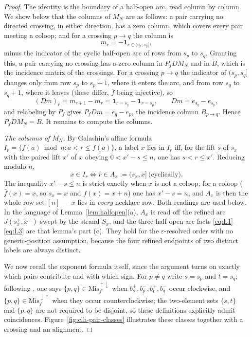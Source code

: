 \documentclass[11pt]{article}
\theoremstyle{definition}
\newcommand{\ba}{\bar f}
\begin{document}
\begin{proof}
The identity is the boundary of a half-open arc, read column by column. We show below that the columns of
$M_N$ are as follows: a pair carrying no directed crossing, in either direction, has a zero column, which
covers every pair meeting a coloop; and for a crossing $p\to q$ the column is
\[
   m_r=-\mathbf 1_{r\in(s_p,s_q]},
\]
minus the indicator of the cyclic half-open arc of rows from $s_p$ to $s_q$. Granting this, a pair carrying no
crossing has a zero column in $P_fDM_N$ and in $B$, which is the incidence matrix of the crossings. For a
crossing $p\to q$ the indicator of $(s_p,s_q]$ changes only from row $s_p$ to $s_p+1$, where it enters the
arc, and from row $s_q$ to $s_q+1$, where it leaves (these differ, $\ba$ being injective), so
\[
   (Dm)_r=m_{r+1}-m_r=\mathbf 1_{r=s_q}-\mathbf 1_{r=s_p},\qquad Dm=e_{s_q}-e_{s_p},
\]
and relabeling by $P_f$ gives $P_fDm=e_q-e_p$, the incidence column $B_{p\to q}$. Hence $P_fDM_N=B$. It
remains to compute the columns.

\emph{The columns of $M_N$.}
By Galashin's affine formula $I_r=\{f(a)\bmod n : a<r\le f(a)\}$, a label $x$ lies in $I_r$ iff, for the
lift $s$ of $s_x$ with the paired lift $x'$ of $x$ obeying $0<x'-s\le n$, one has $s<r\le x'$. Reducing
modulo $n$,
\begin{equation}\label{eq:arc}
   x\in I_r \iff r\in A_x:=(s_x,x]\ \text{(cyclically)}.
\end{equation}
The inequality $x'-s\le n$ is strict exactly when $x$ is not a coloop; for a coloop ($\ba(x)=x$, so
$s_x=x$ and $f(x)=x+n$) one has $x'-s=n$, and $A_x$ is then the whole row set $[n]$ --- $x$ lies in
\emph{every} necklace row. Both readings are used below. In the language of
Lemma~\ref{lem:halfopen}(a), $A_x$ is read off the refined arc $J(s_x^+,x^-)$ swept by the strand $S_x$,
and the three half-open arc facts \eqref{eq:L1}--\eqref{eq:L3} are that lemma's part (c). They hold for
the $\varepsilon$-resolved order with no generic-position assumption, because the four refined
endpoints of two distinct labels are always distinct.

We now recall the exponent formula itself, since the argument turns on exactly which pairs contribute and
with which sign. For $p\ne q$ write $s=s_p$ and $t=s_q$; following \cite[\S5.4]{Galashin}, one says
$\{p,q\}\in\mathrm{Mis}^{\uparrow\downarrow}_f$ when $b^+_{s},b^-_p,b^+_{t},b^-_q$ occur clockwise, and
$\{p,q\}\in\mathrm{Mis}^{\downarrow\uparrow}_f$ when they occur counterclockwise; the two-element sets
$\{s,t\}$ and $\{p,q\}$ are not required to be disjoint, so these definitions explicitly admit
coincidences. Figure~\ref{fig:clh-pair-classes} illustrates these classes together with a crossing and an alignment.


\end{proof}
\end{document}
